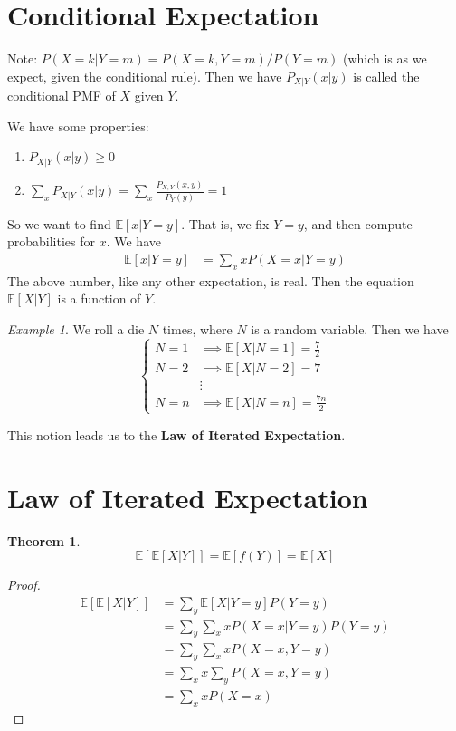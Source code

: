 \documentclass{article}
\newcommand{\E}{\mathbb E}
\newtheorem{theorem}{Theorem}
\theoremstyle{remark}
\newtheorem{example}{Example}[section]
\theoremstyle{definition}
\begin{document}
\section*{Conditional Expectation}
Note: $P(X = k | Y = m) = P(X = k, Y = m) / P(Y = m)$ (which is as we expect, given the conditional rule).
Then we have $P_{X|Y}(x|y)$ is called the conditional PMF of $X$ given $Y$.

We have some properties:
\begin{enumerate}
    \item $P_{X|Y} (x|y) \geq 0$
    \item $\sum_x P_{X|Y}(x|y) = \sum_x \frac{P_{X,Y}(x,y)}{P_Y(y)} = 1$
\end{enumerate}

So we want to find $\E[x|Y=y]$.
That is, we fix $Y = y$, and then compute probabilities for $x$.
We have
\begin{align*}
    \E[x|Y=y] & = \sum_x x P(X=x | Y=y)
\end{align*}
The above number, like any other expectation, is real.
Then the equation $\E[X|Y]$ is a function of $Y$.

\begin{example}
    We roll a die $N$ times, where $N$ is a random variable.
    Then we have
    \begin{equation*}
        \begin{cases}
            N = 1 & \implies \E[X|N=1] = \frac72    \\
            N = 2 & \implies \E[X|N=2] = 7          \\
                  & \vdots                          \\
            N = n & \implies \E[X|N=n] = \frac{7n}2
        \end{cases}
    \end{equation*}
\end{example}

This notion leads us to the \textbf{Law of Iterated Expectation}.

\section*{Law of Iterated Expectation}
\begin{theorem}
    \begin{equation*}
        \E[\E[X|Y]] = \E[f(Y)] = \E[X]
    \end{equation*}
\end{theorem}
\begin{proof}
    \begin{align*}
        \E[\E[X|Y]] & = \sum_y \E[X|Y=y] P(Y=y)                 \\
                    & = \sum_y \sum_x xP(X = x | Y = y)P(Y = y) \\
                    & = \sum_y \sum_x x P(X = x, Y = y)         \\
                    & = \sum_x x \sum_y P(X = x, Y = y)         \\
                    & = \sum_x x P(X = x)
    \end{align*}
\end{proof}
\end{document}
